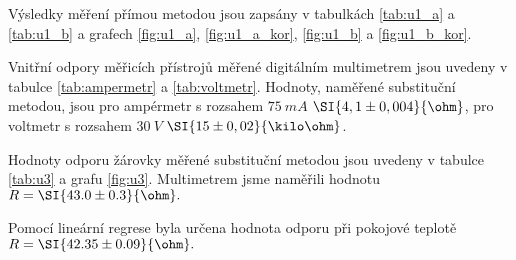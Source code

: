 \documentclass[0-protokol.tex]{subfiles}
\begin{document}
Výsledky měření přímou metodou jsou zapsány v tabulkách \ref{tab:u1_a} a \ref{tab:u1_b} a grafech \ref{fig:u1_a}, \ref{fig:u1_a_kor}, \ref{fig:u1_b} a \ref{fig:u1_b_kor}.

Vnitřní odpory měřicích přístrojů měřené digitálním multimetrem jsou uvedeny v tabulce \ref{tab:ampermetr} a \ref{tab:voltmetr}. Hodnoty, naměřené substituční metodou, jsou pro ampérmetr s rozsahem $\SI{75}{mA}$ $\SI{4,1 \pm 0,004}{\ohm}$, pro voltmetr s rozsahem $\SI{30}{V}$ $\SI{15 \pm 0,02}{\kilo\ohm}$.

Hodnoty odporu žárovky měřené substituční metodou jsou uvedeny v tabulce \ref{tab:u3} a grafu \ref{fig:u3}.
Multimetrem jsme naměřili hodnotu $R = \SI{43.0 \pm 0.3}{\ohm}.$

Pomocí lineární regrese byla určena hodnota odporu při pokojové teplotě $R = \SI{42.35 \pm 0.09}{\ohm}.$

\end{document}
